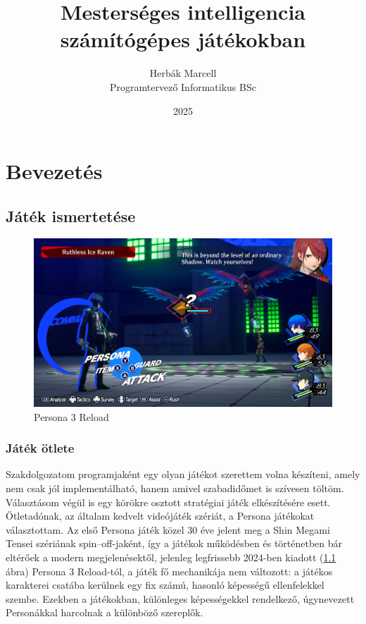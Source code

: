 \documentclass[
]{thesis-ekf}
\theoremstyle{definition}
\theoremstyle{remark}
\begin{document}
\title{Mesterséges intelligencia számítógépes játékokban}
\author{Herbák Marcell\\Programtervező Informatikus BSc}
\date{2025}
\maketitle

\tableofcontents

\chapter{Bevezetés}

\section{Játék ismertetése}

\begin{figure}[h!]
	\centering
	\includegraphics[width=14cm]{./pictures/persona3_xbox.png}
	\caption{Persona 3 Reload}
	\label{persona3}
\end{figure}

\subsection{Játék ötlete}

Szakdolgozatom programjaként \cite{Project} egy olyan játékot szerettem volna készíteni, amely nem csak jól implementálható, hanem amivel szabadidőmet is szívesen töltöm. Választásom végül is egy körökre osztott stratégiai játék elkészítésére esett. Ötletadónak, az általam kedvelt videójáték szériát, a Persona játékokat választottam. Az első Persona játék közel 30 éve jelent meg a Shin Megami Tensei szériának spin--off-jaként, így a játékok működésben és történetben bár eltérőek a modern megjelenésektől, jelenleg legfrissebb 2024-ben kiadott (\ref{persona3} ábra) Persona 3 Reload-tól, a játék fő mechanikája nem változott: a játékos karakterei csatába kerülnek egy fix számú, hasonló képességű ellenfelekkel szembe. Ezekben a játékokban, különleges képességekkel rendelkező, úgynevezett Personákkal harcolnak a különböző szereplők.\cite{Persona,Persona3}
\end{document}

